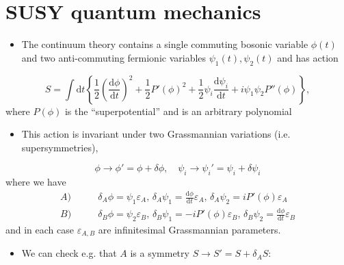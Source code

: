 \section{SUSY quantum mechanics}
\begin{itemize}
    \item The continuum theory contains a single commuting bosonic variable $\phi(t)$ and two anti-commuting fermionic variables $\psi_1(t), \psi_2(t)$ and has action
\end{itemize}
\begin{equation}
    S = \int \text{d}t \left \{ \frac{1}{2}\left( \frac{\text{d} \phi}{\text{d} t}\right)^2 + \frac{1}{2} P'(\phi)^2 + \frac{1}{2} \psi_i \frac{\text{d}\psi_i}{\text{d}t} + i \psi_1 \psi_2 P''(\phi)\right \},
\end{equation}
where $P(\phi)$ is the ``superpotential'' and is an arbitrary polynomial
\begin{itemize}
    \item This action is invariant under two Grassmannian variations (i.e. supersymmetries),
\end{itemize}
\begin{equation}
    \phi \to \phi' = \phi + \delta \phi, \quad \psi_i \to \psi_i' = \psi_i + \delta \psi_i
\end{equation}
where we have
\begin{align}
  A) & \qquad  \delta_A \phi = \psi_1 \varepsilon_A,\, \delta_A \psi_1 = \frac{\text{d}\phi}{\text{d}t} \varepsilon_A,\, \delta_A \psi_2 = i P'(\phi)\varepsilon_A \\
  B) & \qquad  \delta_B\phi = \psi_2 \varepsilon_B,\, \delta_B \psi_1 = -i P'(\phi)\varepsilon_B,\, \delta_B \psi_2 = \frac{\text{d}\phi}{\text{d}t}\varepsilon_B
\end{align}
and in each case $\varepsilon_{A,B}$ are infinitesimal Grassmannian parameters.
\begin{itemize}
    \item We can check e.g. that $A$ is a symmetry $S \to S' = S + \delta_A S$:
\end{itemize}
